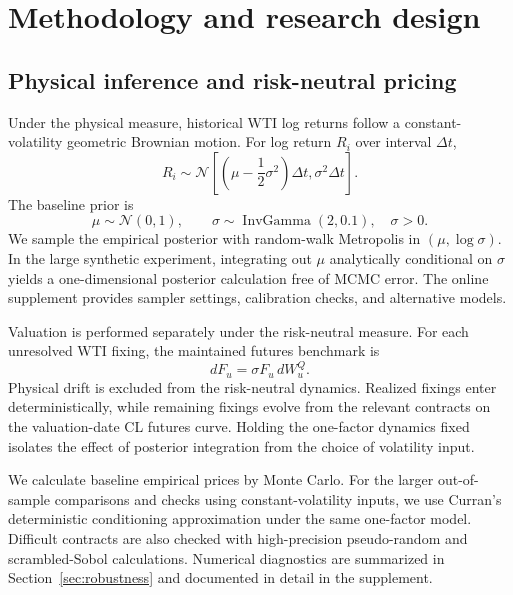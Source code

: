 \section{Methodology and research design}\label{sec:methodology}\label{sec:design}

\subsection{Physical inference and risk-neutral pricing}

Under the physical measure, historical WTI log returns follow a constant-volatility geometric Brownian motion. For log return \(R_i\) over interval \(\Delta t\),
\begin{equation}
 R_i\sim
 \mathcal N\!\left[
 \left(\mu-\frac12\sigma^2\right)\Delta t,
 \sigma^2\Delta t
 \right].
 \label{eq:return_likelihood}
\end{equation}
The baseline prior is
\begin{equation}
 \mu\sim\mathcal N(0,1),
 \qquad
 \sigma\sim\operatorname{InvGamma}(2,0.1),
 \quad \sigma>0.
 \label{eq:priors}
\end{equation}
We sample the empirical posterior with random-walk Metropolis in \((\mu,\log\sigma)\). In the large synthetic experiment, integrating out \(\mu\) analytically conditional on \(\sigma\) yields a one-dimensional posterior calculation free of MCMC error. The online supplement provides sampler settings, calibration checks, and alternative models.

Valuation is performed separately under the risk-neutral measure. For each unresolved WTI fixing, the maintained futures benchmark is
\begin{equation}
 dF_u=\sigma F_u\,dW_u^Q.
 \label{eq:futures_q}
\end{equation}
Physical drift is excluded from the risk-neutral dynamics. Realized fixings enter deterministically, while remaining fixings evolve from the relevant contracts on the valuation-date CL futures curve. Holding the one-factor dynamics fixed isolates the effect of posterior integration from the choice of volatility input.

We calculate baseline empirical prices by Monte Carlo. For the larger out-of-sample comparisons and checks using constant-volatility inputs, we use Curran's deterministic conditioning approximation \cite{curran1994} under the same one-factor model. Difficult contracts are also checked with high-precision pseudo-random and scrambled-Sobol calculations. Numerical diagnostics are summarized in Section~\ref{sec:robustness} and documented in detail in the supplement.

